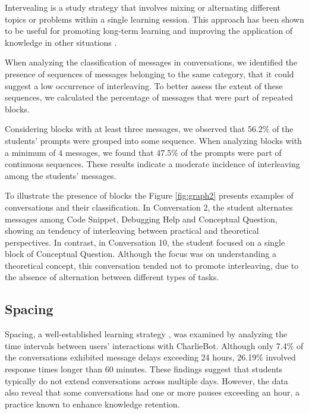 \documentclass[a4paper,twoside]{article}
\begin{document}

Intervealing is a study strategy that involves mixing or alternating different
topics or problems within a single learning session. This
approach has been shown to be useful for promoting long-term learning and
improving the application of knowledge in other situations \cite{Rivers21}.

When analyzing the classification of messages in conversations, we identified
the presence of sequences of messages belonging to the same category, that it
could suggest a low occurrence of interleaving. To better assess the extent of
these sequences, we calculated the percentage of messages that were part of
repeated blocks.

Considering blocks with at least three messages, we observed that 56.2\% of the
students' prompts were grouped into some sequence. When analyzing blocks with a
minimum of 4 messages, we found that 47.5\% of the prompts were part of
continuous sequences. These results indicate a moderate incidence of
interleaving among the students' messages.

To illustrate the presence of blocks the Figure \ref{fig:graph2} presents
examples of conversations and their classification. In Conversation 2, the
student alternates messages among Code Snippet, Debugging Help and Conceptual
Question, showing an tendency of interleaving between practical and theoretical
perspectives. In contrast, in Conversation 10, the student focused on a single
block of Conceptual Question. Although the focus was on understanding a
theoretical concept, this conversation tended not to promote interleaving, due
to the absence of alternation between different types of tasks.


\subsection*{Spacing}

Spacing, a well-established learning strategy \cite{Carvalho20}, was examined
by analyzing the time intervals between users’ interactions with CharlieBot.
Although only 7.4\% of the conversations exhibited message delays exceeding 24
hours, 26.19\% involved response times longer than 60 minutes. These findings
suggest that students typically do not extend conversations across multiple days.
However, the data also reveal that some conversations had one or more pauses
exceeding an hour, a practice known to enhance knowledge retention.

\end{document}
